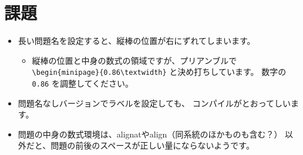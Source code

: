 \documentclass[12pt, a4paper, papersize, dvipdfmx]{jsarticle}
\begin{document}
\section{課題}
\begin{itemize}
\item 長い問題名を設定すると、縦棒の位置が右にずれてしまいます。
    \begin{itemize}
    \item 縦棒の位置と中身の数式の領域ですが、プリアンブルで \\
          \verb|\begin{minipage}{0.86\textwidth}| 
          と決め打ちしています。 
          数字の \verb|0.86| を調整してください。
    \end{itemize}
\item 問題名なしバージョンでラベルを設定しても、
      コンパイルがとおってしいます。
\item 問題の中身の数式環境は、alignatやalign（同系統のほかものも含む？）
      以外だと、問題の前後のスペースが正しい量にならないようです。
\end{itemize}
\end{document}
